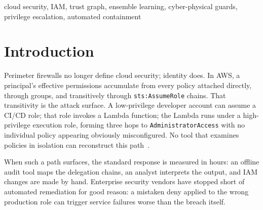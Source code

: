 \documentclass[conference,a4paper]{IEEEtran}
\begin{document}
\begin{abstract}
Cloud breaches rarely stay contained to a single account or role.
Attackers exploit chains of permission hand-offs, hopping across
identities and services to reach high-privilege resources well before
any human can respond. Existing tools detect or report this movement,
but stop short of acting on it automatically.

TrustField bridges that gap. It models every permission relationship
as a directed trust graph, runs a multi-model propagation ensemble to
predict how far a breach can spread, and verifies each predicted path
against live cloud access semantics before acting. Containment is
enforced through reversible deny policies, deployed by a fault-tolerant
guard network that requires consensus before any change is made.

Evaluated across 28 real-world privilege-escalation scenarios,
TrustField achieved full coverage, completed detection-to-containment
in under 100 milliseconds on 100-node graphs, and held above 80\%
detection accuracy even when attackers actively restructured their paths to evade it.
\end{abstract}

\begin{IEEEkeywords}
cloud security, IAM, trust graph, ensemble learning,
cyber-physical guards, privilege escalation, automated containment
\end{IEEEkeywords}

\section{Introduction}

Perimeter firewalls no longer define cloud security; identity does.
In AWS, a principal's effective permissions accumulate from every policy
attached directly, through groups, and transitively through
\texttt{sts:AssumeRole} chains. That transitivity is the attack surface.
A low-privilege developer account can assume a CI/CD role; that role
invokes a Lambda function; the Lambda runs under a high-privilege
execution role, forming three hops to \texttt{AdministratorAccess} with no
individual policy appearing obviously misconfigured. No tool that examines
policies in isolation can reconstruct this path~\cite{rhino_cloudgoat}.

When such a path surfaces, the standard response is measured in hours:
an offline audit tool maps the delegation chains, an analyst interprets
the output, and IAM changes are made by hand. Enterprise security vendors
have stopped short of automated remediation for good reason: a mistaken
deny applied to the wrong production role can trigger service failures
worse than the breach itself.
\end{document}
